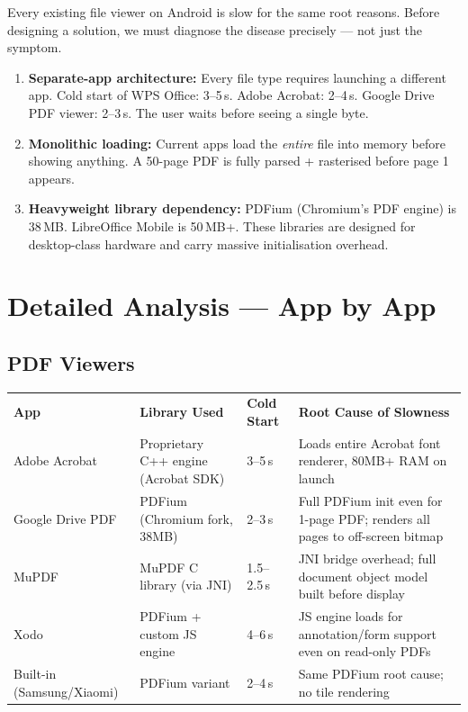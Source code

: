 \documentclass[12pt,a4paper]{report}
\newcommand{\ra}[1]{\renewcommand{\arraystretch}{#1}}
\newcommand{\TH}[1]{\rowcolor{P1}\color{white}\bfseries #1}
\begin{document}
Every existing file viewer on Android is slow for the same root reasons. Before
designing a solution, we must diagnose the disease precisely — not just the
symptom.

\begin{cbox}
\begin{enumerate}[leftmargin=1.4em,topsep=2pt,itemsep=5pt]
\item \textbf{Separate-app architecture:} Every file type requires launching a
  different app. Cold start of WPS Office: 3--5\,s. Adobe Acrobat: 2--4\,s.
  Google Drive PDF viewer: 2--3\,s. The user waits before seeing a single byte.
\item \textbf{Monolithic loading:} Current apps load the \emph{entire} file into
  memory before showing anything. A 50-page PDF is fully parsed + rasterised
  before page 1 appears.
\item \textbf{Heavyweight library dependency:} PDFium (Chromium's PDF engine) is
  38\,MB. LibreOffice Mobile is 50\,MB+. These libraries are designed for
  desktop-class hardware and carry massive initialisation overhead.
\end{enumerate}
\end{cbox}

\section{Detailed Analysis — App by App}

\subsection{PDF Viewers}

\begin{center}\ra{1.35}
\begin{tabular}{L{3.0cm} L{2.8cm} L{2.8cm} L{5.2cm}}
\TH{App} & \TH{Library Used} & \TH{Cold Start} & \TH{Root Cause of Slowness} \\
 Adobe Acrobat & Proprietary C++ engine (Acrobat SDK) & 3--5\,s &
  Loads entire Acrobat font renderer, 80MB+ RAM on launch \\
 Google Drive PDF & PDFium (Chromium fork, 38MB) & 2--3\,s &
  Full PDFium init even for 1-page PDF; renders all pages to off-screen bitmap \\
 MuPDF & MuPDF C library (via JNI) & 1.5--2.5\,s &
  JNI bridge overhead; full document object model built before display \\
 Xodo & PDFium + custom JS engine & 4--6\,s &
  JS engine loads for annotation/form support even on read-only PDFs \\
 Built-in (Samsung/Xiaomi) & PDFium variant & 2--4\,s &
  Same PDFium root cause; no tile rendering \\
\end{tabular}
\end{center}
\end{document}

